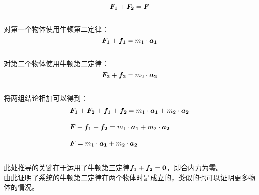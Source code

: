 \documentclass[UTF8]{ctexart}
\newcommand*{\veb}[1]{\vb*{#1}}
\begin{document}
    \begin{equation}
        \veb{F_1}+\veb{F_2}=\veb{F}
    \end{equation}\\
    对第一个物体使用牛顿第二定律：
    \begin{equation}
        \veb{F_1}+\veb{f_1}=m_1\cdot\veb{a_1}
    \end{equation}\\
    对第二个物体使用牛顿第二定律：
    \begin{equation}
        \veb{F_2}+\veb{f_2}=m_2\cdot\veb{a_2}
    \end{equation}\\
    将两组结论相加可以得到：
    \begin{align}
        &\veb{F_1}+\veb{F_2}+\veb{f_1}+\veb{f_2}=m_1\cdot\veb{a_1}+m_2\cdot\veb{a_2}\\[3mm]
        &\veb{F}+\veb{f_1}+\veb{f_2}=m_1\cdot\veb{a_1}+m_2\cdot\veb{a_2}\\[3mm]
        &\veb{F}=m_1\cdot\veb{a_1}+m_2\cdot\veb{a_2}
    \end{align}\\
    此处推导的关键在于运用了牛顿第三定律$\veb{f_1}+\veb{f_2}=\veb{0}$，即合内力为零。\\[3mm]
    由此证明了系统的牛顿第二定律在两个物体时是成立的，类似的也可以证明更多物体的情况。
    

\newpage
\end{document}
